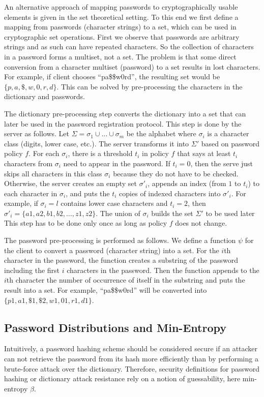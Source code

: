An alternative approach of mapping passwords to cryptographically usable elements is given in the set theoretical setting.
To this end we first define a mapping from passwords (character strings) to a set, which can be used in cryptographic set operations.
First we observe that passwords are arbitrary strings and as such can have repeated characters. 
So the collection of characters in a password forms a multiset, not a set. 
The problem is that some direct conversion from a character multiset (password) to a set results in lost characters.
For example, if client chooses ``pa\$\$w0rd'', the resulting set would be $\{p,a,\$,w,0,r,d\}$.
This can be solved by pre-processing the characters in the dictionary and passwords.

The dictionary pre-processing step converts the dictionary into a set that can later be used in the password registration protocol. 
This step is done by the server as follows. 
Let $\Sigma=\sigma_1\cup\dots\cup \sigma_m$ be the alphabet where $\sigma_i$ is a character class (digits, lower case, etc.). 
The server transforms it into $\Sigma'$ based on password policy $f$. 
For each $\sigma_i$, there is a threshold $t_i$ in policy $f$ that says at least $t_i$ characters from $\sigma_i$ need to appear in the password. 
If $t_i = 0$, then the serve just skips all characters in this class $\sigma_i$ because they do not have to be checked. 
Otherwise, the server creates an empty set $\sigma'_i$, appends an index (from $1$ to $t_i$) to each character in $\sigma_i$, and puts the $t_i$ copies of indexed characters into $\sigma'_i$. 
For example, if $\sigma_i=l$ contains lower case characters and $t_i=2$, then $\sigma'_i=\{a1,a2,b1,b2,\ldots,z1,z2\}$. 
The union of $\sigma_i$ builds the set $\Sigma'$ to be used later 
This step has to be done only once as long as policy $f$ does not change.

The password pre-processing is performed as follows. 
We define a function $\psi$ for the client to convert a password (character string) into a set. 
For the $i$th character in the password, the function creates a substring of the password including the first $i$ characters in the password. 
Then the function appends to the $i$th character the number of occurrence of itself in the substring and puts the result into a set. 
For example, ``pa\$\$w0rd'' will be converted into $\{p1,a1,\$1,\$2,w1,01,r1,d1\}$. 
 


\subsection{Password Distributions and Min-Entropy} \label{sec:min-entropy}
Intuitively, a password hashing scheme should be considered secure if an attacker can not retrieve the password from its hash more efficiently than by performing a brute-force attack over the dictionary. 
Therefore, security definitions for password hashing or dictionary attack resistance rely on a notion of guessability, here min-entropy $\beta$.

